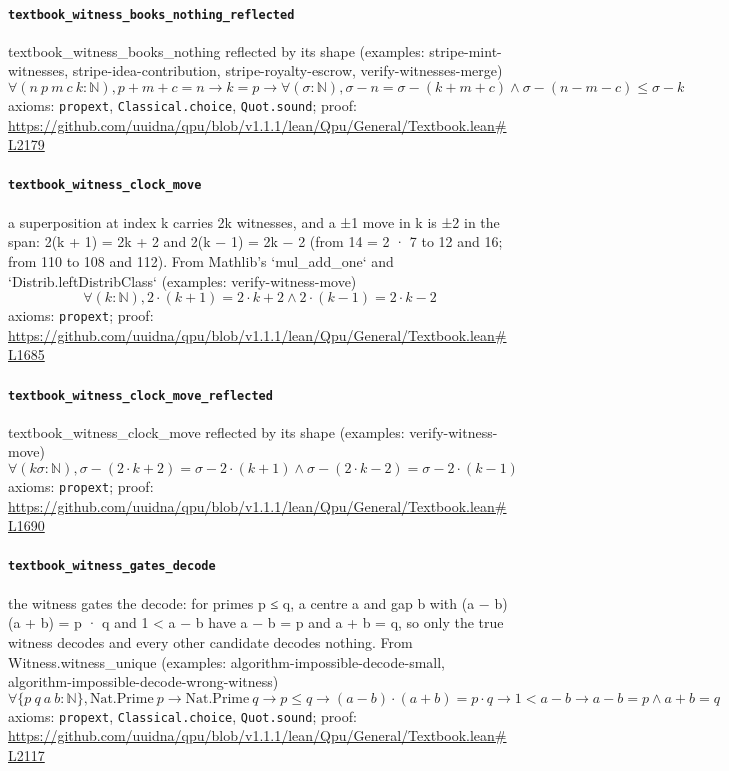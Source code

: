 \documentclass[11pt]{article}
\begin{document}
\paragraph{\texttt{textbook\_witness\_books\_nothing\_reflected}}
textbook\_witness\_books\_nothing reflected by its shape (examples: stripe-mint-witnesses, stripe-idea-contribution, stripe-royalty-escrow, verify-witnesses-merge)
\[ \forall (n\ p\ m\ c\ k : \mathbb{N}), p + m + c = n \to k = p \to \forall (\sigma : \mathbb{N}), \sigma - n = \sigma - (k + m + c) \land \sigma - (n - m - c) \le \sigma - k \]
\noindent axioms: \texttt{propext}, \texttt{Classical.choice}, \texttt{Quot.sound}; proof: \url{https://github.com/uuidna/qpu/blob/v1.1.1/lean/Qpu/General/Textbook.lean\#L2179}

\paragraph{\texttt{textbook\_witness\_clock\_move}}
a superposition at index k carries 2k witnesses, and a ±1 move in k is ±2 in the span: 2(k + 1) = 2k + 2 and 2(k − 1) = 2k − 2 (from 14 = 2 · 7 to 12 and 16; from 110 to 108 and 112). From Mathlib's `mul\_add\_one` and `Distrib.leftDistribClass` (examples: verify-witness-move)
\[ \forall (k : \mathbb{N}), 2 \cdot (k + 1) = 2 \cdot k + 2 \land 2 \cdot (k - 1) = 2 \cdot k - 2 \]
\noindent axioms: \texttt{propext}; proof: \url{https://github.com/uuidna/qpu/blob/v1.1.1/lean/Qpu/General/Textbook.lean\#L1685}

\paragraph{\texttt{textbook\_witness\_clock\_move\_reflected}}
textbook\_witness\_clock\_move reflected by its shape (examples: verify-witness-move)
\[ \forall (k \sigma : \mathbb{N}), \sigma - (2 \cdot k + 2) = \sigma - 2 \cdot (k + 1) \land \sigma - (2 \cdot k - 2) = \sigma - 2 \cdot (k - 1) \]
\noindent axioms: \texttt{propext}; proof: \url{https://github.com/uuidna/qpu/blob/v1.1.1/lean/Qpu/General/Textbook.lean\#L1690}

\paragraph{\texttt{textbook\_witness\_gates\_decode}}
the witness gates the decode: for primes p ≤ q, a centre a and gap b with (a − b)(a + b) = p · q and 1 < a − b have a − b = p and a + b = q, so only the true witness decodes and every other candidate decodes nothing. From Witness.witness\_unique (examples: algorithm-impossible-decode-small, algorithm-impossible-decode-wrong-witness)
\[ \forall \{p\ q\ a\ b : \mathbb{N}\}, \mathrm{Nat.Prime}\ p \to \mathrm{Nat.Prime}\ q \to p \le q \to (a - b) \cdot (a + b) = p \cdot q \to 1 < a - b \to a - b = p \land a + b = q \]
\noindent axioms: \texttt{propext}, \texttt{Classical.choice}, \texttt{Quot.sound}; proof: \url{https://github.com/uuidna/qpu/blob/v1.1.1/lean/Qpu/General/Textbook.lean\#L2117}
\end{document}
